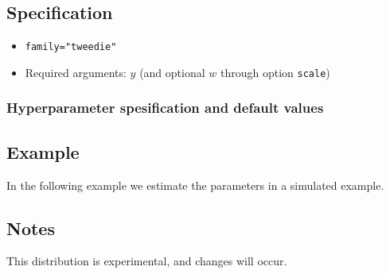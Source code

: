 \documentclass[a4paper,11pt]{article}
\begin{document}
\subsection*{Specification}

\begin{itemize}
\item \texttt{family="tweedie"}
\item Required arguments: $y$ (and optional $w$ through option
    \texttt{scale})
\end{itemize}

\subsubsection*{Hyperparameter spesification and default values}


\subsection*{Example}

In the following example we estimate the parameters in a simulated
example.


\subsection*{Notes}

This distribution is experimental, and changes will occur.
\end{document}
